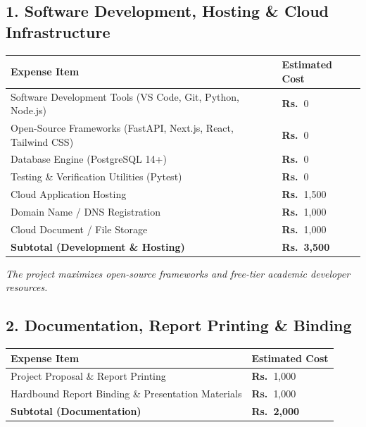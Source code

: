\documentclass[11pt,a4paper]{article}
\newcommand{\INR}{\textbf{Rs.~}}
\begin{document}
\subsection*{1. Software Development, Hosting \& Cloud Infrastructure}
\begin{table}[htbp]
\centering
\small
\renewcommand{\arraystretch}{1.15}
\begin{tabularx}{0.88\textwidth}{|X|>{\raggedleft\arraybackslash}p{3.2cm}|}
\hline
\rowcolor{tablehead}
\textbf{\color{white}Expense Item} & \textbf{\color{white}Estimated Cost} \\ \hline
Software Development Tools (VS Code, Git, Python, Node.js) & \INR 0 \\ \hline
Open-Source Frameworks (FastAPI, Next.js, React, Tailwind CSS) & \INR 0 \\ \hline
Database Engine (PostgreSQL 14+) & \INR 0 \\ \hline
Testing \& Verification Utilities (Pytest) & \INR 0 \\ \hline
Cloud Application Hosting & \INR 1,500 \\ \hline
Domain Name / DNS Registration & \INR 1,000 \\ \hline
Cloud Document / File Storage & \INR 1,000 \\ \hline
\rowcolor{tablerow}
\textbf{Subtotal (Development \& Hosting)} & \textbf{\INR 3,500} \\ \hline
\end{tabularx}
\end{table}
\textit{\footnotesize The project maximizes open-source frameworks and free-tier academic developer resources.}

\subsection*{2. Documentation, Report Printing \& Binding}
\begin{table}[htbp]
\centering
\small
\renewcommand{\arraystretch}{1.15}
\begin{tabularx}{0.88\textwidth}{|X|>{\raggedleft\arraybackslash}p{3.2cm}|}
\hline
\rowcolor{tablehead}
\textbf{\color{white}Expense Item} & \textbf{\color{white}Estimated Cost} \\ \hline
Project Proposal \& Report Printing & \INR 1,000 \\ \hline
Hardbound Report Binding \& Presentation Materials & \INR 1,000 \\ \hline
\rowcolor{tablerow}
\textbf{Subtotal (Documentation)} & \textbf{\INR 2,000} \\ \hline
\end{tabularx}
\end{table}
\end{document}
